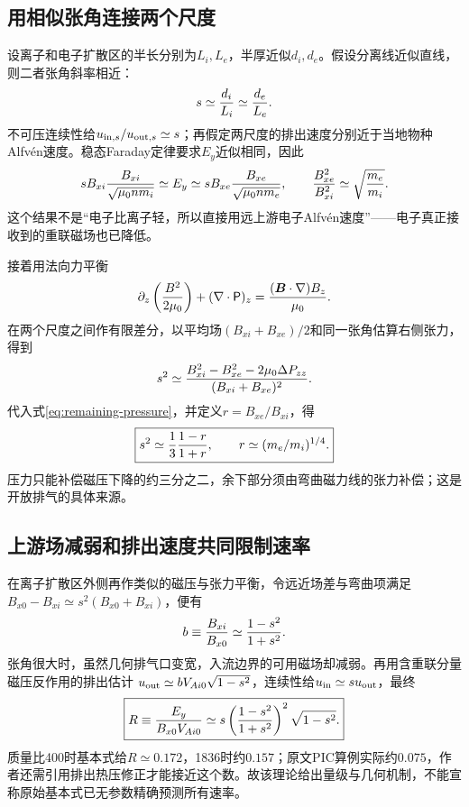 \documentclass[UTF8,a4paper,11pt,openany,fontset=fandol]{ctexbook}
\begin{document}
\subsection{用相似张角连接两个尺度}
设离子和电子扩散区的半长分别为$L_i,L_e$，半厚近似$d_i,d_e$。假设分离线近似直线，则二者张角斜率相近：
\begin{equation}
 s\simeq{d_i\over L_i}\simeq{d_e\over L_e}.
\end{equation}
不可压连续性给$u_{{\rm in},s}/u_{{\rm out},s}\simeq s$；再假定两尺度的排出速度分别近于当地物种Alfvén速度。稳态Faraday定律要求$E_y$近似相同，因此
\begin{equation}
 s B_{xi}{B_{xi}\over\sqrt{\mu_0nm_i}}
 \simeq E_y\simeq
 s B_{xe}{B_{xe}\over\sqrt{\mu_0nm_e}},
 \qquad {B_{xe}^2\over B_{xi}^2}\simeq\sqrt{m_e\over m_i}.
 \label{eq:remaining-field-ratio}
\end{equation}
这个结果不是“电子比离子轻，所以直接用远上游电子Alfvén速度”——电子真正接收到的重联磁场也已降低。

接着用法向力平衡
\begin{equation}
 \partial_z\left({B^2\over2\mu_0}\right)+(\nabla\cdot\mathsf P)_z
 ={(\bm{B}\cdot\nabla)B_z\over\mu_0}.
\end{equation}
在两个尺度之间作有限差分，以平均场$(B_{xi}+B_{xe})/2$和同一张角估算右侧张力，得到
\begin{equation}
 s^2\simeq{B_{xi}^2-B_{xe}^2-2\mu_0\Delta P_{zz}\over(B_{xi}+B_{xe})^2}.
\end{equation}
代入式\eqref{eq:remaining-pressure}，并定义$r=B_{xe}/B_{xi}$，得
\begin{equation}
 \boxed{s^2\simeq{1\over3}{1-r\over1+r},\qquad
 r\simeq(m_e/m_i)^{1/4}.}
\end{equation}
压力只能补偿磁压下降的约三分之二，余下部分须由弯曲磁力线的张力补偿；这是开放排气的具体来源。

\subsection{上游场减弱和排出速度共同限制速率}
在离子扩散区外侧再作类似的磁压与张力平衡，令远近场差与弯曲项满足
$B_{x0}-B_{xi}\simeq s^2(B_{x0}+B_{xi})$，便有
\begin{equation}
 b\equiv{B_{xi}\over B_{x0}}\simeq{1-s^2\over1+s^2}.
\end{equation}
张角很大时，虽然几何排气口变宽，入流边界的可用磁场却减弱。再用含重联分量磁压反作用的排出估计
$u_{\rm out}\simeq bV_{Ai0}\sqrt{1-s^2}$，连续性给$u_{\rm in}\simeq s u_{\rm out}$，最终
\begin{equation}
 \boxed{R\equiv{E_y\over B_{x0}V_{Ai0}}
 \simeq s\left({1-s^2\over1+s^2}\right)^2\sqrt{1-s^2}.}
 \label{eq:remaining-rate}
\end{equation}
质量比400时基本式给$R\simeq0.172$，1836时约$0.157$；原文PIC算例实际约$0.075$，作者还需引用排出热压修正才能接近这个数。故该理论给出量级与几何机制，不能宣称原始基本式已无参数精确预测所有速率\citep{F589}。
\end{document}
